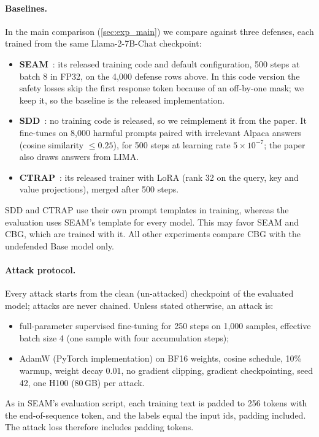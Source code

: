 \documentclass[11pt]{article}
\begin{document}
\paragraph{Baselines.}
In the main comparison (\cref{sec:exp_main}) we compare against three defenses, each trained from the same Llama-2-7B-Chat checkpoint:
\begin{itemize}
  \item \textbf{SEAM}~\citep{wang2026seam}: its released training code and default configuration, 500 steps at batch 8 in FP32, on the 4{,}000 defense rows above. In this code version the safety losses skip the first response token because of an off-by-one mask; we keep it, so the baseline is the released implementation.
  \item \textbf{SDD}~\citep{chen2025sdd}: no training code is released, so we reimplement it from the paper. It fine-tunes on 8{,}000 harmful prompts paired with irrelevant Alpaca answers (cosine similarity $\le0.25$), for 500 steps at learning rate $5\times10^{-7}$; the paper also draws answers from LIMA.
  \item \textbf{CTRAP}~\citep{yi2025ctrap}: its released trainer with LoRA (rank 32 on the query, key and value projections), merged after 500 steps.
\end{itemize}
SDD and CTRAP use their own prompt templates in training, whereas the evaluation uses SEAM's template for every model. This may favor SEAM and CBG, which are trained with it. All other experiments compare CBG with the undefended Base model only.

\paragraph{Attack protocol.}
Every attack starts from the clean (un-attacked) checkpoint of the evaluated model; attacks are never chained. Unless stated otherwise, an attack is:
\begin{itemize}
  \item full-parameter supervised fine-tuning for 250 steps on 1{,}000 samples, effective batch size 4 (one sample with four accumulation steps);
  \item AdamW (PyTorch implementation) on BF16 weights, cosine schedule, 10\% warmup, weight decay $0.01$, no gradient clipping, gradient checkpointing, seed 42, one H100 (80\,GB) per attack.
\end{itemize}
As in SEAM's evaluation script, each training text is padded to 256 tokens with the end-of-sequence token, and the labels equal the input ids, padding included. The attack loss therefore includes padding tokens.
\end{document}
